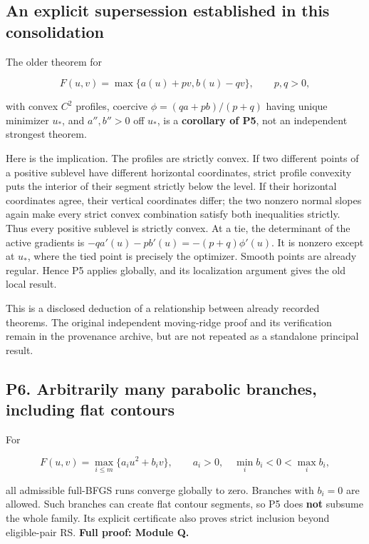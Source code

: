 \documentclass[10pt,oneside,openany]{book}
\theoremstyle{remark}\newtheorem{remark}{Remark}[chapter]
\begin{document}
\subsection{An explicit supersession established in this consolidation}\label{an-explicit-supersession-established-in-this-consolidation}

The older theorem for

\[F(u,v)=\max\{a(u)+pv,b(u)-qv\},\qquad p,q>0,\]

with convex \(C^2\) profiles, coercive \(\phi=(qa+pb)/(p+q)\) having unique minimizer \(u_*\), and \(a'',b''>0\) off \(u_*\), is a \textbf{corollary of P5}, not an independent strongest theorem.

Here is the implication. The profiles are strictly convex. If two different points of a positive sublevel have different horizontal coordinates, strict profile convexity puts the interior of their segment strictly below the level. If their horizontal coordinates agree, their vertical coordinates differ; the two nonzero normal slopes again make every strict convex combination satisfy both inequalities strictly. Thus every positive sublevel is strictly convex. At a tie, the determinant of the active gradients is \(-qa'(u)-pb'(u)=-(p+q)\phi'(u)\). It is nonzero except at \(u_*\), where the tied point is precisely the optimizer. Smooth points are already regular. Hence P5 applies globally, and its localization argument gives the old local result.

This is a disclosed deduction of a relationship between already recorded theorems. The original independent moving-ridge proof and its verification remain in the provenance archive, but are not repeated as a standalone principal result.

\subsection{P6. Arbitrarily many parabolic branches, including flat contours}\label{p6.-arbitrarily-many-parabolic-branches-including-flat-contours}

For

\[F(u,v)=\max_{i\le m}\{a_i u^2+b_iv\},\qquad a_i>0,
\quad\min_i b_i<0<\max_i b_i,\]

all admissible full-BFGS runs converge globally to zero. Branches with \(b_i=0\) are allowed. Such branches can create flat contour segments, so P5 does \textbf{not} subsume the whole family. Its explicit certificate also proves strict inclusion beyond eligible-pair RS. \textbf{Full proof: Module Q.}
\end{document}
